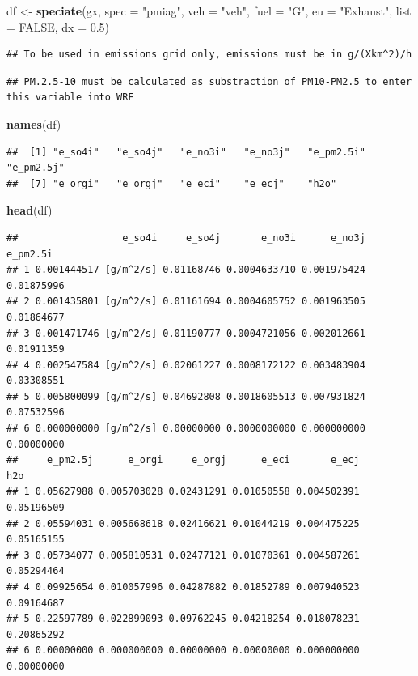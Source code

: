 \documentclass[12pt,graybox,envcountchap,sectrefs]{krantz}
\makeatletter
\newenvironment{Shaded}{\begin{snugshade}}{\end{snugshade}}
\newcommand{\KeywordTok}[1]{\textcolor[rgb]{0.13,0.29,0.53}{\textbf{#1}}}
\newcommand{\DataTypeTok}[1]{\textcolor[rgb]{0.13,0.29,0.53}{#1}}
\newcommand{\FloatTok}[1]{\textcolor[rgb]{0.00,0.00,0.81}{#1}}
\newcommand{\StringTok}[1]{\textcolor[rgb]{0.31,0.60,0.02}{#1}}
\newcommand{\OtherTok}[1]{\textcolor[rgb]{0.56,0.35,0.01}{#1}}
\newcommand{\NormalTok}[1]{#1}
\newenvironment{kframe}{%
\medskip{}
\setlength{\fboxsep}{.8em}
 \def\at@end@of@kframe{}%
 \ifinner\ifhmode%
  \def\at@end@of@kframe{\end{minipage}}%
  \begin{minipage}{\columnwidth}%
 \fi\fi%
 \def\FrameCommand##1{\hskip\@totalleftmargin \hskip-\fboxsep
 \colorbox{shadecolor}{##1}\hskip-\fboxsep
     \hskip-\linewidth \hskip-\@totalleftmargin \hskip\columnwidth}%
 \MakeFramed {\advance\hsize-\width
   \@totalleftmargin\z@ \linewidth\hsize
   \@setminipage}}%
 {\par\unskip\endMakeFramed%
 \at@end@of@kframe}
\renewenvironment{Shaded}{\begin{kframe}}{\end{kframe}}
\theoremstyle{definition}
\theoremstyle{definition}
\theoremstyle{definition}
\theoremstyle{remark}
\makeatother
\begin{document}
\begin{Shaded}
\begin{Highlighting}[]
\NormalTok{df <-}\StringTok{ }\KeywordTok{speciate}\NormalTok{(gx, }\DataTypeTok{spec =} \StringTok{"pmiag"}\NormalTok{, }\DataTypeTok{veh =} \StringTok{"veh"}\NormalTok{, }\DataTypeTok{fuel =} \StringTok{"G"}\NormalTok{,}
               \DataTypeTok{eu =} \StringTok{"Exhaust"}\NormalTok{, }\DataTypeTok{list =} \OtherTok{FALSE}\NormalTok{, }\DataTypeTok{dx =} \FloatTok{0.5}\NormalTok{)}
\end{Highlighting}
\end{Shaded}

\begin{verbatim}
## To be used in emissions grid only, emissions must be in g/(Xkm^2)/h
\end{verbatim}

\begin{verbatim}
## PM.2.5-10 must be calculated as substraction of PM10-PM2.5 to enter this variable into WRF
\end{verbatim}

\begin{Shaded}
\begin{Highlighting}[]
\KeywordTok{names}\NormalTok{(df)}
\end{Highlighting}
\end{Shaded}

\begin{verbatim}
##  [1] "e_so4i"   "e_so4j"   "e_no3i"   "e_no3j"   "e_pm2.5i" "e_pm2.5j"
##  [7] "e_orgi"   "e_orgj"   "e_eci"    "e_ecj"    "h2o"
\end{verbatim}

\begin{Shaded}
\begin{Highlighting}[]
\KeywordTok{head}\NormalTok{(df)}
\end{Highlighting}
\end{Shaded}

\begin{verbatim}
##                  e_so4i     e_so4j       e_no3i      e_no3j   e_pm2.5i
## 1 0.001444517 [g/m^2/s] 0.01168746 0.0004633710 0.001975424 0.01875996
## 2 0.001435801 [g/m^2/s] 0.01161694 0.0004605752 0.001963505 0.01864677
## 3 0.001471746 [g/m^2/s] 0.01190777 0.0004721056 0.002012661 0.01911359
## 4 0.002547584 [g/m^2/s] 0.02061227 0.0008172122 0.003483904 0.03308551
## 5 0.005800099 [g/m^2/s] 0.04692808 0.0018605513 0.007931824 0.07532596
## 6 0.000000000 [g/m^2/s] 0.00000000 0.0000000000 0.000000000 0.00000000
##     e_pm2.5j      e_orgi     e_orgj      e_eci       e_ecj        h2o
## 1 0.05627988 0.005703028 0.02431291 0.01050558 0.004502391 0.05196509
## 2 0.05594031 0.005668618 0.02416621 0.01044219 0.004475225 0.05165155
## 3 0.05734077 0.005810531 0.02477121 0.01070361 0.004587261 0.05294464
## 4 0.09925654 0.010057996 0.04287882 0.01852789 0.007940523 0.09164687
## 5 0.22597789 0.022899093 0.09762245 0.04218254 0.018078231 0.20865292
## 6 0.00000000 0.000000000 0.00000000 0.00000000 0.000000000 0.00000000
\end{verbatim}
\end{document}
